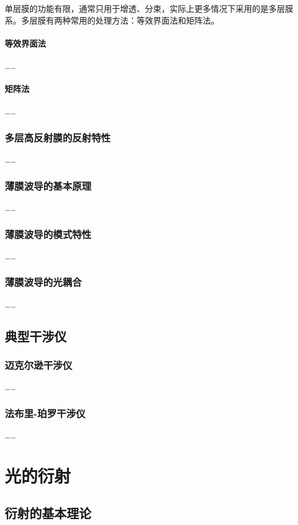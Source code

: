 \documentclass[cn,10pt,chinesefont=founder,math=mtpro2,cite=super,toc=onecol,twoside,openany]{elegantbook}
\begin{document}
单层膜的功能有限，通常只用于增透、分束，实际上更多情况下采用的是多层膜系。多层膜有两种常用的处理方法：等效界面法和矩阵法。

\subsubsection{等效界面法}
……

\subsubsection{矩阵法}
……

\subsection{多层高反射膜的反射特性}
……


\subsection{薄膜波导的基本原理}
……

\subsection{薄膜波导的模式特性}
……

\subsection{薄膜波导的光耦合}
……

\section{典型干涉仪}

\subsection{迈克尔逊干涉仪}
……

\subsection{法布里-珀罗干涉仪}
……

\chapter{光的衍射}

\section{衍射的基本理论}
\end{document}
